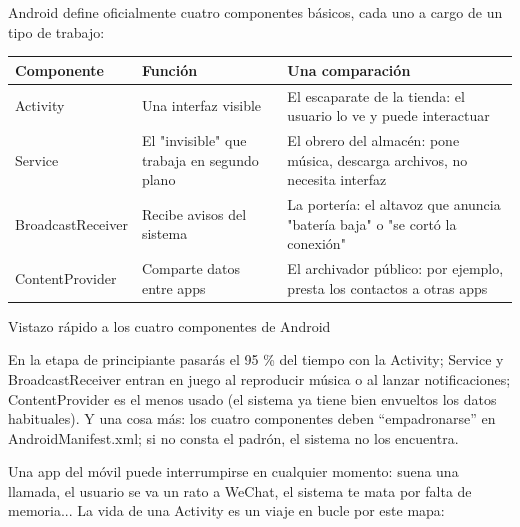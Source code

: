 


Android define oficialmente cuatro componentes básicos, cada uno a cargo de un tipo de trabajo:

\begin{center}
\begin{tabularx}{\linewidth}{|X|X|X|}
\hline
\textbf{Componente} & \textbf{Función} & \textbf{Una comparación} \tabularnewline
\hline
Activity & Una interfaz visible & El escaparate de la tienda: el usuario lo ve y puede interactuar \tabularnewline
Service & El "invisible" que trabaja en segundo plano & El obrero del almacén: pone música, descarga archivos, no necesita interfaz \tabularnewline
BroadcastReceiver & Recibe avisos del sistema & La portería: el altavoz que anuncia "batería baja" o "se cortó la conexión" \tabularnewline
ContentProvider & Comparte datos entre apps & El archivador público: por ejemplo, presta los contactos a otras apps \tabularnewline
\hline
\end{tabularx}
\end{center}

\begin{center}\small\color{gray}Vistazo rápido a los cuatro componentes de Android\end{center}

En la etapa de principiante pasarás el 95 \% del tiempo con la Activity; Service y BroadcastReceiver entran en juego al reproducir música o al lanzar notificaciones; ContentProvider es el menos usado (el sistema ya tiene bien envueltos los datos habituales). Y una cosa más: los cuatro componentes deben “empadronarse” en AndroidManifest.xml; si no consta el padrón, el sistema no los encuentra.


Una app del móvil puede interrumpirse en cualquier momento: suena una llamada, el usuario se va un rato a WeChat, el sistema te mata por falta de memoria... La vida de una Activity es un viaje en bucle por este mapa:

